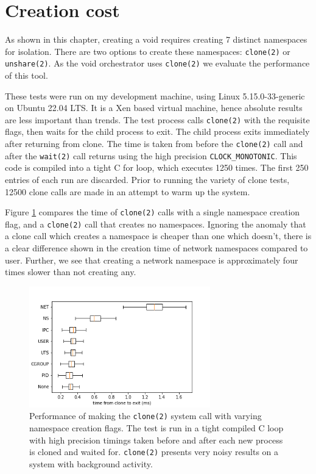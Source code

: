 \documentclass[12pt,a4paper,twoside]{report}
\begin{document}
\section{Creation cost}
\label{sec:void-creation-costs}

As shown in this chapter, creating a void requires creating 7 distinct namespaces for isolation. There are two options to create these namespaces: \texttt{clone(2)} or \texttt{unshare(2)}. As the void orchestrator uses \texttt{clone(2)} we evaluate the performance of this tool.

These tests were run on my development machine, using Linux 5.15.0-33-generic on Ubuntu 22.04 LTS. It is a Xen based virtual machine, hence absolute results are less important than trends. The test process calls \texttt{clone(2)} with the requisite flags, then waits for the child process to exit. The child process exits immediately after returning from clone. The time is taken from before the \texttt{clone(2)} call and after the \texttt{wait(2)} call returns using the high precision \texttt{CLOCK\_MONOTONIC}. This code is compiled into a tight C for loop, which executes 1250 times. The first 250 entries of each run are discarded. Prior to running the variety of clone tests, 12500 clone calls are made in an attempt to warm up the system.

Figure \ref{fig:namespace-times} compares the time of \texttt{clone(2)} calls with a single namespace creation flag, and a \texttt{clone(2)} call that creates no namespaces. Ignoring the anomaly that a clone call which creates a namespace is cheaper than one which doesn't, there is a clear difference shown in the creation time of network namespaces compared to user. Further, we see that creating a network namespace is approximately four times slower than not creating any.

\begin{figure}
    \centering
    \includegraphics[width=0.7\textwidth]{graphs/clone_individual_namespaces.png}

    \caption{Performance of making the \texttt{clone(2)} system call with varying namespace creation flags. The test is run in a tight compiled C loop with high precision timings taken before and after each new process is cloned and waited for. \texttt{clone(2)} presents very noisy results on a system with background activity.}
    \label{fig:namespace-times}
\end{figure}
\end{document}

